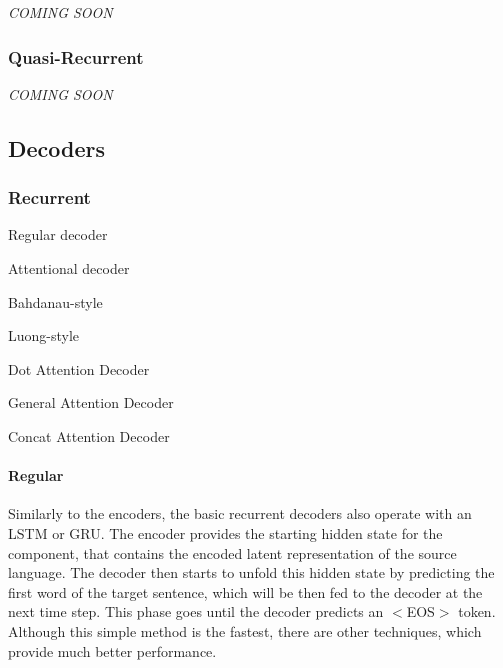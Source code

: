 {\itshape C\+O\+M\+I\+NG S\+O\+ON}

\subsubsection*{Quasi-\/\+Recurrent}

{\itshape C\+O\+M\+I\+NG S\+O\+ON}





\subsection*{Decoders}

\subsubsection*{Recurrent}


\begin{DoxyEnumerate}
\item Regular decoder
\item Attentional decoder
\begin{DoxyEnumerate}
\item Bahdanau-\/style
\item Luong-\/style
\begin{DoxyEnumerate}
\item Dot Attention Decoder
\item General Attention Decoder
\item Concat Attention Decoder
\end{DoxyEnumerate}
\end{DoxyEnumerate}
\end{DoxyEnumerate}

\paragraph*{Regular}

Similarly to the encoders, the basic recurrent decoders also operate with an L\+S\+TM or G\+RU. The encoder provides the starting hidden state for the component, that contains the encoded latent representation of the source language. The decoder then starts to unfold this hidden state by predicting the first word of the target sentence, which will be then fed to the decoder at the next time step. This phase goes until the decoder predicts an $<$\+E\+O\+S$>$ token. Although this simple method is the fastest, there are other techniques, which provide much better performance.

